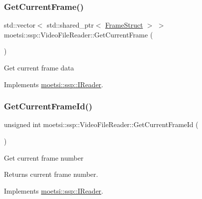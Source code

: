 \subsubsection{\texorpdfstring{Get\+Current\+Frame()}{GetCurrentFrame()}}
{\footnotesize\ttfamily std\+::vector$<$ std\+::shared\+\_\+ptr$<$ \hyperlink{structmoetsi_1_1ssp_1_1FrameStruct}{Frame\+Struct} $>$ $>$ moetsi\+::ssp\+::\+Video\+File\+Reader\+::\+Get\+Current\+Frame (\begin{DoxyParamCaption}{ }\end{DoxyParamCaption})\hspace{0.3cm}{\ttfamily [virtual]}}

Get current frame data 

Implements \hyperlink{classmoetsi_1_1ssp_1_1IReader_a357439182128e3911d77335c136035c0}{moetsi\+::ssp\+::\+I\+Reader}.

\mbox{\label{classmoetsi_1_1ssp_1_1VideoFileReader_aef5c92da2645cddc7e4ffcfd34ad4b8a}} 
\subsubsection{\texorpdfstring{Get\+Current\+Frame\+Id()}{GetCurrentFrameId()}}
{\footnotesize\ttfamily unsigned int moetsi\+::ssp\+::\+Video\+File\+Reader\+::\+Get\+Current\+Frame\+Id (\begin{DoxyParamCaption}{ }\end{DoxyParamCaption})\hspace{0.3cm}{\ttfamily [virtual]}}

Get current frame number \begin{DoxyReturn}{Returns}
current frame number. 
\end{DoxyReturn}


Implements \hyperlink{classmoetsi_1_1ssp_1_1IReader_ac292d83eb06dee277baaa06e281a562d}{moetsi\+::ssp\+::\+I\+Reader}.

\mbox{\label{classmoetsi_1_1ssp_1_1VideoFileReader_a83359ad82898acdb75240568b182247c}} 
